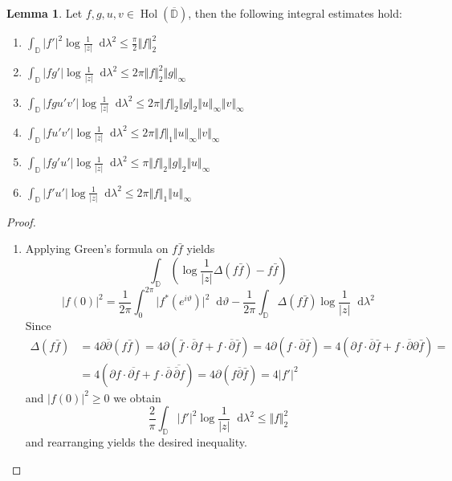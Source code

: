 \documentclass[letterpaper, 11pt]{article}
\newcommand{\D}{\mathbb{D}}
\newcommand{\1}{\mathds{1}}
\newcommand{\diff}{\mathop{}\!\mathrm{d}}
\newcommand{\cl}[1]{\overline{#1}}
\DeclareMathOperator*{\Hol}{Hol}
\theoremstyle{definition}
\newtheorem{lemma}[theorem]{Lemma}
\begin{document}
\begin{lemma}
  Let $f, g, u, v \in \Hol(\cl{\D})$, then the following integral estimates hold:
  \begin{enumerate}
    \item $ \displaystyle \int_\D \vert f' \vert^2 \log \frac{1}{\vert z \vert} \diff \lambda^2 \leq \frac{\pi}{2} \Vert f \Vert_2^2 $
    \item $ \displaystyle \int_\D \vert f g' \vert \log \frac{1}{\vert z \vert} \diff \lambda^2 \leq 2 \pi \Vert f \Vert_2^2 \Vert g \Vert_\infty $
    \item $ \displaystyle \int_\D \vert f g u' v' \vert \log \frac{1}{\vert z \vert} \diff \lambda^2 \leq 2 \pi \Vert f \Vert_2 \Vert g \Vert_2 \Vert u \Vert_\infty \Vert v \Vert_\infty $
    \item $ \displaystyle \int_\D \vert f u' v' \vert \log \frac{1}{\vert z \vert} \diff \lambda^2 \leq 2 \pi \Vert f \Vert_1 \Vert u \Vert_\infty \Vert v \Vert_\infty $
    \item $ \displaystyle \int_\D \vert f g' u' \vert \log \frac{1}{\vert z \vert} \diff \lambda^2 \leq \pi \Vert f \Vert_2 \Vert g \Vert_2 \Vert u \Vert_\infty $
    \item $ \displaystyle \int_\D \vert f' u' \vert \log \frac{1}{\vert z \vert} \diff \lambda^2 \leq 2 \pi \Vert f \Vert_1 \Vert u \Vert_\infty $
  \end{enumerate}
\end{lemma}

\begin{proof} {\ }
  \begin{enumerate}
    \item Applying Green's formula on $f \bar{f}$ yields
    $$ \int_\D (\log \frac{1}{\vert z \vert} \Delta (f \bar{f}) - f \bar{f}) $$
    $$ \vert f(0) \vert^2 = \frac{1}{2 \pi} \int_0^{2 \pi} \vert f^*(e^{i \vartheta}) \vert^2 \diff \vartheta - \frac{1}{2 \pi} \int_\D \Delta(f \bar{f}) \log \frac{1}{\vert z \vert} \diff \lambda^2 $$
    Since
    \begin{align*}
      \Delta(f \bar{f}) &= 4 \partial \overline{\partial} (f \bar{f}) = 4 \partial ( \bar{f} \cdot \overline{\partial} f + f \cdot \overline{\partial} \bar{f} ) = 4 \partial (f \cdot \overline{\partial} \bar{f}) = 4 (\partial f \cdot \overline{\partial} \bar{f} + f \cdot \overline{\partial} \partial \bar{f}) = \\
      &= 4 (\partial f \cdot \overline{\partial f} + f \cdot \overline{\partial} \,\overline{ \overline{\partial} f }) = 4 \partial ( f \overline{\partial} \bar{f} ) = 4 \vert f' \vert^2
    \end{align*}
    and $ \vert f(0) \vert^2 \geq 0$ we obtain
    $$ \frac{2}{\pi} \int_\D \vert f' \vert^2  \log \frac{1}{\vert z \vert} \diff \lambda^2 \leq \Vert f \Vert_2^2 $$
    and rearranging yields the desired inequality.
  \end{enumerate}
\end{proof}
\end{document}
